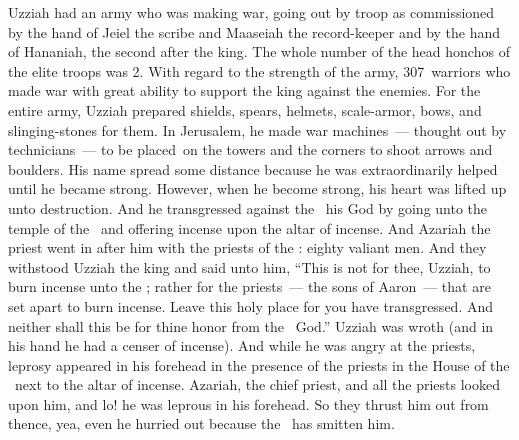 \begin{inparaenum}
   Uzziah had an army who was making war, going out by troop as commissioned by the hand of Jeiel the scribe and Maaseiah the record-keeper and by the hand of Hananiah, the second after the king.%
   The whole number of the head honchos of the elite troops was 2.%
   With regard to the strength of the army, 307~warriors who made war with great ability to support the king against the enemies.%
   For the entire army, Uzziah prepared shields, spears, helmets, scale-armor, bows, and slinging-stones for them.%
   In Jerusalem, he made war machines~--- thought out by technicians~--- to be placed\understood\ on the towers and the corners to shoot arrows and boulders. His name spread some distance because he was extraordinarily helped  until he became strong.%
   However, when he become strong, his heart was lifted up unto destruction. And he transgressed against the \lord\ his God by going unto the temple of the \lord\ and offering incense upon the altar of incense.%
   And Azariah the priest went in after him with the priests of the \lord: eighty valiant men.%
   And they withstood Uzziah the king and said unto him, ``This is not for thee, Uzziah, to burn incense unto the \lord; rather for the priests~--- the sons of Aaron~--- that are set apart to burn incense. Leave this holy place for you have transgressed. And neither shall this be for thine honor from the \lord\ God.''%
   Uzziah was wroth (and in his hand he had a censer of incense). And while he was angry at the priests, leprosy appeared in his forehead in the presence of the priests in the House of the \lord\ next to the altar of incense.%
   Azariah, the chief priest, and all the priests looked upon him, and lo! he was leprous in his forehead. So they thrust him out from thence, yea, even he hurried out because the \lord\ has smitten him.%

\end{inparaenum}
